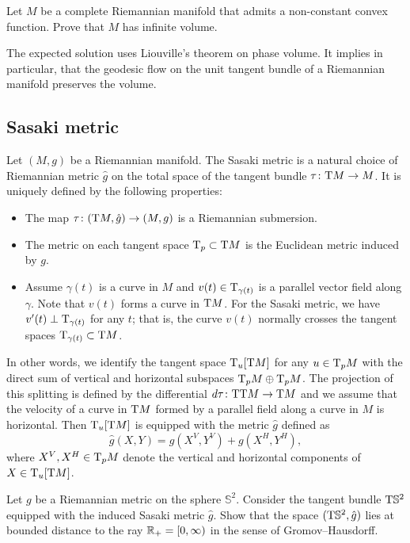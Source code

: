 \begin{pr}
Let $M$ be a complete Riemannian manifold that admits a non-constant convex function. 
Prove that $M$ has infinite volume.
\end{pr}

The expected solution uses Liouville's theorem on phase volume.
It implies in particular, that the geodesic flow on the unit tangent bundle of a Riemannian manifold preserves the volume.


\subsection*{Sasaki metric}
\label{pr:Sasaki metric}

Let $(M,g)$ be a Riemannian manifold.
The Sasaki metric is a natural choice of Riemannian metric $\hat g$ on the total space of the tangent bundle $\tau\colon\mathrm{T} M\to M$.
It is uniquely defined by the following properties:
\begin{itemize}
\item The map $\tau\colon(\mathrm{T} M,\hat g)\to (M,g)$ is a Riemannian submersion.
\item The metric on each tangent space $\mathrm{T}_p\subset \mathrm{T} M$ is the Euclidean metric induced by $g$.
\item Assume $\gamma(t)$ is a curve in $M$ and $v(t)\in\mathrm{T}_{\gamma(t)}$ is a parallel vector field along $\gamma$. 
Note that $v(t)$ forms a curve in $\mathrm{T} M$.
For the Sasaki metric, we have $v'(t)\perp \mathrm{T}_{\gamma(t)}$ for any $t$;
that is, the curve $v(t)$ normally crosses the tangent spaces $\mathrm{T}_{\gamma(t)}\subset \mathrm{T} M$.
\end{itemize}

In other words, we identify the tangent space 
$\mathrm{T}_u[\mathrm{T} M]$ for any $u\in \mathrm{T}_p M$ with the direct sum of vertical and horizontal subspaces $\mathrm{T}_p M\oplus \mathrm{T}_p M$.
The projection of this splitting is defined by the differential $d\tau\colon\mathrm{T}\mathrm{T} M\to \mathrm{T} M$
and we assume that the velocity of a curve in $\mathrm{T} M$ formed by a parallel field along a curve in $M$ is horizontal.
Then $\mathrm{T}_u[\mathrm{T} M]$ is equipped with the metric $\hat g$ defined as 
\[\hat g(X,Y)=g(X^V,Y^V)+g(X^H,Y^H),\]
where $X^V,X^H\in\mathrm{T}_pM$ denote the vertical and horizontal components of $X\in\mathrm{T}_u[\mathrm{T} M]$.



\begin{pr}
Let $g$ be a Riemannian metric on the sphere $\mathbb{S}^2$.
Consider the tangent bundle $\mathrm{T} \mathbb{S}^2$ 
equipped with the induced Sasaki metric $\hat g$.
Show that
the space $(\mathrm{T} \mathbb{S}^2, \hat g)$ lies at bounded distance to the ray $\mathbb{R}_+=[0,\infty)$ in the sense of Gromov--Hausdorff.
\end{pr}


